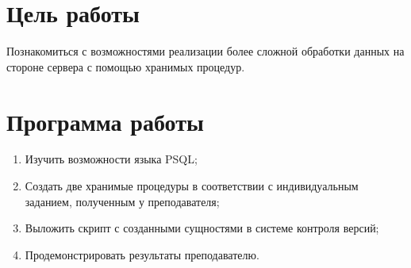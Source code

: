 \section{Цель работы}

Познакомиться с возможностями реализации более сложной обработки данных на стороне сервера с помощью хранимых процедур.

\section{Программа работы}

\begin{enumerate}
	\item Изучить возможности языка PSQL;
	\item Создать две хранимые процедуры в соответствии с индивидуальным заданием, полученным у преподавателя;
	\item Выложить скрипт с созданными сущностями в системе контроля версий;
	\item Продемонстрировать результаты преподавателю.
\end{enumerate}